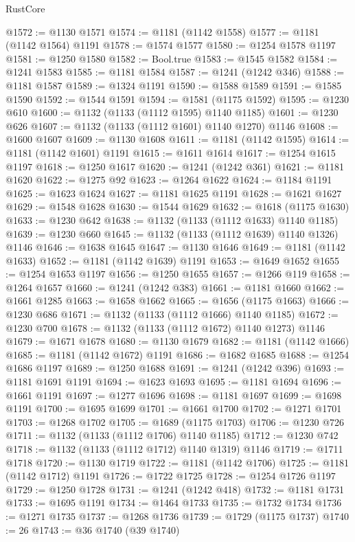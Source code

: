 \begin{lexlean}{RustCore}
\begin{coremodule}
@1572 := @1130 @1571
@1574 := @1181 (@1142 @1558)
@1577 := @1181 (@1142 @1564) @1191
@1578 := @1574 @1577
@1580 := @1254 @1578 @1197
@1581 := @1250 @1580
@1582 := Bool.true
@1583 := @1545 @1582
@1584 := @1241 @1583
@1585 := @1181 @1584
@1587 := @1241 (@1242 @346)
@1588 := @1181 @1587
@1589 := @1324 @1191
@1590 := @1588 @1589
@1591 := @1585 @1590
@1592 := @1544 @1591
@1594 := @1581 (@1175 @1592)
@1595 := @1230 @610
@1600 := @1132 (@1133 (@1112 @1595) @1140 @1185)
@1601 := @1230 @626
@1607 := @1132 (@1133 (@1112 @1601) @1140 @1270) @1146
@1608 := @1600 @1607
@1609 := @1130 @1608
@1611 := @1181 (@1142 @1595)
@1614 := @1181 (@1142 @1601) @1191
@1615 := @1611 @1614
@1617 := @1254 @1615 @1197
@1618 := @1250 @1617
@1620 := @1241 (@1242 @361)
@1621 := @1181 @1620
@1622 := @1275 @92
@1623 := @1264 @1622
@1624 := @1184 @1191
@1625 := @1623 @1624
@1627 := @1181 @1625 @1191
@1628 := @1621 @1627
@1629 := @1548 @1628
@1630 := @1544 @1629
@1632 := @1618 (@1175 @1630)
@1633 := @1230 @642
@1638 := @1132 (@1133 (@1112 @1633) @1140 @1185)
@1639 := @1230 @660
@1645 := @1132 (@1133 (@1112 @1639) @1140 @1326) @1146
@1646 := @1638 @1645
@1647 := @1130 @1646
@1649 := @1181 (@1142 @1633)
@1652 := @1181 (@1142 @1639) @1191
@1653 := @1649 @1652
@1655 := @1254 @1653 @1197
@1656 := @1250 @1655
@1657 := @1266 @119
@1658 := @1264 @1657
@1660 := @1241 (@1242 @383)
@1661 := @1181 @1660
@1662 := @1661 @1285
@1663 := @1658 @1662
@1665 := @1656 (@1175 @1663)
@1666 := @1230 @686
@1671 := @1132 (@1133 (@1112 @1666) @1140 @1185)
@1672 := @1230 @700
@1678 := @1132 (@1133 (@1112 @1672) @1140 @1273) @1146
@1679 := @1671 @1678
@1680 := @1130 @1679
@1682 := @1181 (@1142 @1666)
@1685 := @1181 (@1142 @1672) @1191
@1686 := @1682 @1685
@1688 := @1254 @1686 @1197
@1689 := @1250 @1688
@1691 := @1241 (@1242 @396)
@1693 := @1181 @1691 @1191
@1694 := @1623 @1693
@1695 := @1181 @1694
@1696 := @1661 @1191
@1697 := @1277 @1696
@1698 := @1181 @1697
@1699 := @1698 @1191
@1700 := @1695 @1699
@1701 := @1661 @1700
@1702 := @1271 @1701
@1703 := @1268 @1702
@1705 := @1689 (@1175 @1703)
@1706 := @1230 @726
@1711 := @1132 (@1133 (@1112 @1706) @1140 @1185)
@1712 := @1230 @742
@1718 := @1132 (@1133 (@1112 @1712) @1140 @1319) @1146
@1719 := @1711 @1718
@1720 := @1130 @1719
@1722 := @1181 (@1142 @1706)
@1725 := @1181 (@1142 @1712) @1191
@1726 := @1722 @1725
@1728 := @1254 @1726 @1197
@1729 := @1250 @1728
@1731 := @1241 (@1242 @418)
@1732 := @1181 @1731
@1733 := @1695 @1191
@1734 := @1464 @1733
@1735 := @1732 @1734
@1736 := @1271 @1735
@1737 := @1268 @1736
@1739 := @1729 (@1175 @1737)
@1740 := 26
@1743 := @36 @1740 (@39 @1740)

\end{coremodule}
\end{lexlean}
